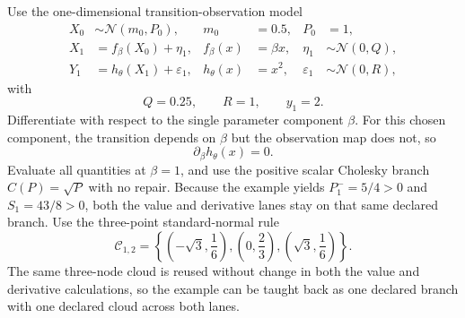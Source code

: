 \documentclass[11pt]{article}
\numberwithin{equation}{section}
\newcommand{\N}{\mathcal N}
\begin{document}
Use the one-dimensional transition-observation model
\begin{align}
  X_0 &\sim \N(m_0,P_0),
  &m_0&=0.5,
  &P_0&=1,
  \label{eq:p32-example-initial}\\
  X_1 &= f_\beta(X_0)+\eta_1,
  &f_\beta(x)&=\beta x,
  &\eta_1&\sim \N(0,Q),
  \label{eq:p32-example-transition}\\
  Y_1 &= h_\theta(X_1)+\varepsilon_1,
  &h_\theta(x)&=x^2,
  &\varepsilon_1&\sim \N(0,R),
  \label{eq:p32-example-observation}
\end{align}
with
\begin{equation}
  Q=0.25,
  \qquad
  R=1,
  \qquad
  y_1=2.
  \label{eq:p32-example-QRy}
\end{equation}
Differentiate with respect to the single parameter component \(\beta\).  For
this chosen component, the transition depends on \(\beta\) but the observation
map does not, so
\begin{equation}
  \partial_\beta h_\theta(x)=0.
  \label{eq:p32-example-hbeta-zero}
\end{equation}
Evaluate all quantities at \(\beta=1\), and use the positive scalar Cholesky
branch \(C(P)=\sqrt P\) with no repair.  Because the example yields
\(P_1^-=5/4>0\) and \(S_1=43/8>0\), both the value and derivative lanes stay on
that same declared branch.  Use the three-point standard-normal rule
\begin{equation}
  \mathcal C_{1,2}
  =
  \left\{
  \left(-\sqrt3,\frac16\right),
  \left(0,\frac23\right),
  \left(\sqrt3,\frac16\right)
  \right\}.
  \label{eq:p32-example-cloud}
\end{equation}
The same three-node cloud is reused without change in both the value and
derivative calculations, so the example can be taught back as one declared branch with one declared cloud across both lanes.
\end{document}
